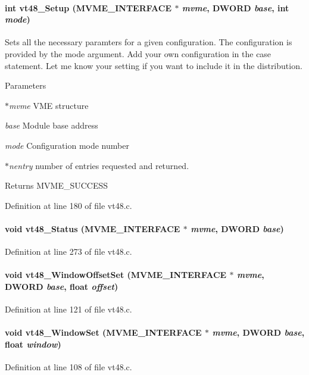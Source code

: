 \paragraph[{vt48\_\-Setup}]{\setlength{\rightskip}{0pt plus 5cm}int vt48\_\-Setup ({\bf MVME\_\-INTERFACE} $\ast$ {\em mvme}, \/  {\bf DWORD} {\em base}, \/  int {\em mode})}\hfill\label{vt48_8c_aa6237edcb797fb9ebb0d447a5b1edbcd}
Sets all the necessary paramters for a given configuration. The configuration is provided by the mode argument. Add your own configuration in the case statement. Let me know your setting if you want to include it in the distribution. 
\begin{DoxyParams}{Parameters}
\item[{\em $\ast$mvme}]VME structure \item[{\em base}]Module base address \item[{\em mode}]Configuration mode number \item[{\em $\ast$nentry}]number of entries requested and returned. \end{DoxyParams}
\begin{DoxyReturn}{Returns}
MVME\_\-SUCCESS 
\end{DoxyReturn}


Definition at line 180 of file vt48.c.
\paragraph[{vt48\_\-Status}]{\setlength{\rightskip}{0pt plus 5cm}void vt48\_\-Status ({\bf MVME\_\-INTERFACE} $\ast$ {\em mvme}, \/  {\bf DWORD} {\em base})}\hfill\label{vt48_8c_a8c2825023005fcd48c424e75dde70ce3}


Definition at line 273 of file vt48.c.
\paragraph[{vt48\_\-WindowOffsetSet}]{\setlength{\rightskip}{0pt plus 5cm}void vt48\_\-WindowOffsetSet ({\bf MVME\_\-INTERFACE} $\ast$ {\em mvme}, \/  {\bf DWORD} {\em base}, \/  float {\em offset})}\hfill\label{vt48_8c_afd51ba644c73189293c6fab7de739533}


Definition at line 121 of file vt48.c.
\paragraph[{vt48\_\-WindowSet}]{\setlength{\rightskip}{0pt plus 5cm}void vt48\_\-WindowSet ({\bf MVME\_\-INTERFACE} $\ast$ {\em mvme}, \/  {\bf DWORD} {\em base}, \/  float {\em window})}\hfill\label{vt48_8c_a5643216541b3d8c374948f45ec2d22f1}


Definition at line 108 of file vt48.c.